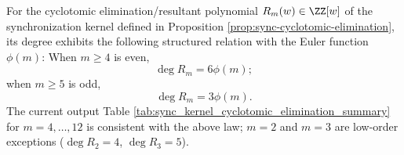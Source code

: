 \begin{conjecture}\label{conj:sync-cyclotomic-elimination-degree-law}
For the cyclotomic elimination/resultant polynomial
\(R_m(w)\in\ZZ[w]\) of the synchronization kernel defined in Proposition \ref{prop:sync-cyclotomic-elimination}, its degree exhibits the following structured relation with the Euler function \(\phi(m)\):
When \(m\ge 4\) is even,
\[
\deg R_m=6\phi(m);
\]
when \(m\ge 5\) is odd,
\[
\deg R_m=3\phi(m).
\]
The current output Table \ref{tab:sync_kernel_cyclotomic_elimination_summary} for \(m=4,\dots,12\) is consistent with the above law; \(m=2\) and \(m=3\) are low-order exceptions (\(\deg R_2=4\), \(\deg R_3=5\)).
\end{conjecture}
